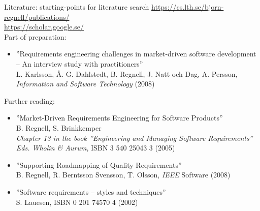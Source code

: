 \documentclass{beamer}
\begin{document}
\begin{frame}[fragile]{Literature: starting-points for literature search}
\footnotesize
\url{https://cs.lth.se/bjorn-regnell/publications/}\\
\url{https://scholar.google.se/}\\
\vfill
Part of preparation:
\begin{itemize}\footnotesize
  \item ''Requirements engineering challenges in market-driven
  software development -- An interview study with practitioners'' \\ L. Karlsson, Å. G. Dahlstedt, B. Regnell, J. Natt och Dag, A. Persson, \emph{Information and Software Technology} (2008) 
\end{itemize}

  Further reading: 
\begin{itemize}\footnotesize
  \item ''Market-Driven Requirements Engineering for Software Products'' \\ B. Regnell, S. Brinkkemper \\ \emph{Chapter 13 in the book ''Engineering and Managing Software Requirements'' Eds. Wholin \& Aurum},  ISBN 3 540 25043 3 (2005)
  \item ''Supporting Roadmapping of Quality Requirements'' \\ B. Regnell, R. Berntsson Svensson, T. Olsson, \emph{IEEE} Software (2008) 
  \item ''Software requirements -- styles and techniques'' \\ S. Lauesen, ISBN 0 201 74570 4  (2002) 
\end{itemize}

\end{frame}
\end{document}
